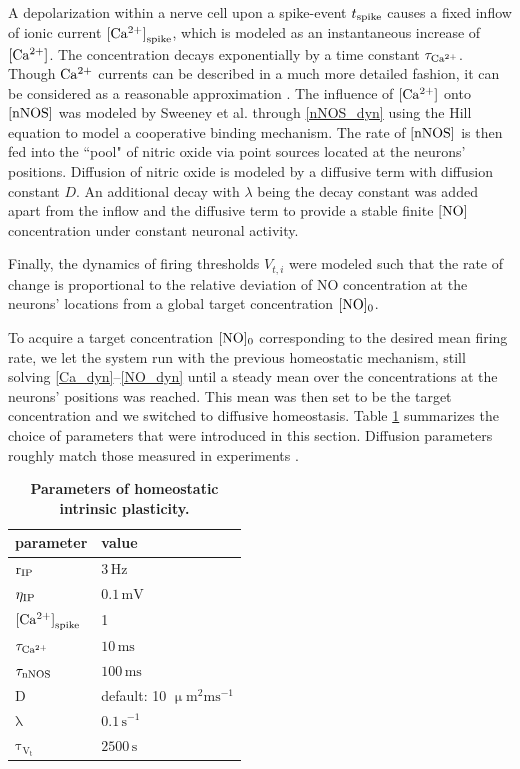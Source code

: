 \documentclass[10pt,letterpaper]{article}
\begin{document}
A depolarization within a nerve cell upon a spike-event $t_{\rm spike}$ causes a fixed inflow of ionic current ${\rm [Ca^{2+}]}_{\rm spike}$, which is modeled as an instantaneous increase of $\rm [Ca^{2+}]$. The concentration decays exponentially by a time constant $\tau_{\rm Ca^{2+}}$. Though $\rm Ca^{2+}$ currents can be described in a much more detailed fashion, it can be considered as a reasonable approximation \cite[p.~198-203]{Theor_Neur_Dayan}. The influence of $\rm [Ca^{2+}]$ onto $\rm [nNOS]$ was modeled by Sweeney et al. through \eqref{nNOS_dyn} using the Hill equation \cite{Hill_Equ} to model a cooperative binding mechanism. The rate of $\rm [nNOS]$ is then fed into the ``pool" of nitric oxide via point sources located at the neurons' positions. Diffusion of nitric oxide is modeled by a diffusive term with diffusion constant $D$. An additional decay with $\lambda$ being the decay constant was added apart from the inflow and the diffusive term to provide a stable finite $\rm [NO]$ concentration under constant neuronal activity.

Finally, the dynamics of firing thresholds $V_{t,i}$ were modeled such that the rate of change is proportional to the relative deviation of NO concentration at the neurons' locations from a global target concentration $\rm [NO]_0$. 

To acquire a target concentration $\rm [NO]_0$ corresponding to the desired mean firing rate, we let the system run with the previous homeostatic mechanism, still solving \eqref{Ca_dyn}--\eqref{NO_dyn} until a steady mean over the concentrations at the neurons' positions was reached. This mean was then set to be the target concentration and we switched to diffusive homeostasis. Table \ref{Params_IP} summarizes the choice of parameters that were introduced in this section. Diffusion parameters roughly match those measured in experiments \cite{Philippides_2000}.
\begin{table}
\caption{\bf Parameters of homeostatic intrinsic plasticity.}
\begin{tabular}{|l|l|}
\hline
\textbf{parameter} & \textbf{value} \\
\hline
$\mathrm{r_{\rm IP}}$ & $\mathrm{3\,Hz}$ \\
\hline
$\mathrm{\eta_{\rm IP}}$ & $\mathrm{0.1\,mV}$ \\
\hline
${\rm [Ca^{2+}]}_{\rm spike}$ & 1 \\ \hline
$\mathrm{\tau_{\rm Ca^{2+}}}$ &  $\mathrm{10\,ms}$ \\
\hline
$\mathrm{\tau_{\rm nNOS}}$ & $\mathrm{100\,ms}$ \\
\hline
$\mathrm{D}$ & default: 10 $\mathrm{\upmu m^2 ms^{-1}}$ \\
\hline 
$\mathrm{\lambda}$ & $\mathrm{0.1\,s^{-1}}$ \\
\hline
$\mathrm{\tau_{V_t}}$ & $\mathrm{2500\,s}$ \\
\hline
\end{tabular}
\label{Params_IP}
\end{table}
\end{document}
